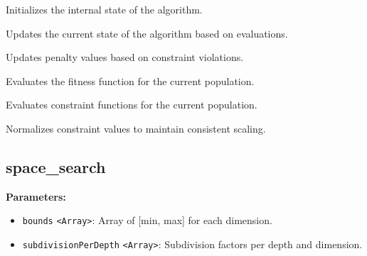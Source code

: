 \documentclass[12pt,a4paper]{article}
\begin{document}
\noindent Initializes the internal state of the algorithm.

\vspace{5mm}
\noindent {}


\noindent Updates the current state of the algorithm based on evaluations.

\vspace{5mm}
\noindent {}


\noindent Updates penalty values based on constraint violations.

\vspace{5mm}
\noindent {}


\noindent Evaluates the fitness function for the current population.

\vspace{5mm}
\noindent {}


\noindent Evaluates constraint functions for the current population.

\vspace{5mm}
\noindent {}


\noindent Normalizes constraint values to maintain consistent scaling.


\subsection{space\_search}
\vspace{5mm}
\noindent {}


\noindent \textbf{Parameters:}
\begin{itemize}
  \item \texttt{bounds} \texttt{<Array>}: Array of [min, max] for each dimension.
  \item \texttt{subdivisionPerDepth} \texttt{<Array>}: Subdivision factors per depth and dimension.
\end{itemize}
\end{document}
